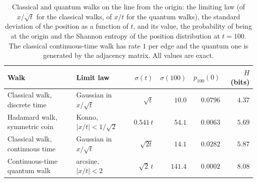 \begin{table}[htbp]
\centering\small
\caption[Classical and quantum walks on the line at $t=100$]{Classical and quantum walks on the line from the origin: the limiting law (of $x/\sqrt{t}$ for the classical walks, of $x/t$ for the quantum walks), the standard deviation of the position as a function of $t$, and its value, the probability of being at the origin and the Shannon entropy of the position distribution at $t=100$. The classical continuous-time walk has rate $1$ per edge and the quantum one is generated by the adjacency matrix. All values are exact.}
\label{tab:walkcrw}
\begin{tabular}{llrrrr}
\hline
Walk & Limit law & $\sigma(t)$ & $\sigma(100)$ & $p_{100}(0)$ & $H$ (bits) \\
\hline
Classical walk, discrete time & Gaussian in $x/\sqrt{t}$ & $\sqrt{t}$ & $10.0$ & $0.0796$ & $4.37$ \\
Hadamard walk, symmetric coin & Konno, $|x/t|<1/\sqrt{2}$ & $0.541\,t$ & $54.1$ & $0.0063$ & $5.69$ \\
Classical walk, continuous time & Gaussian in $x/\sqrt{t}$ & $\sqrt{2t}$ & $14.1$ & $0.0282$ & $5.87$ \\
Continuous-time quantum walk & arcsine, $|x/t|<2$ & $\sqrt{2}\,t$ & $141.4$ & $0.0002$ & $8.08$ \\
\hline
\end{tabular}
\end{table}
